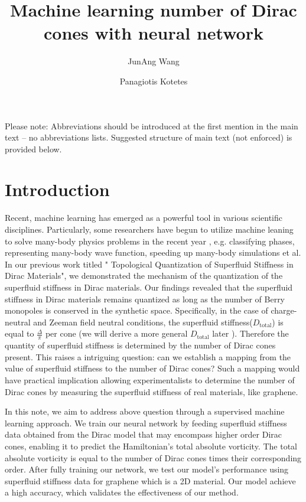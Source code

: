 \documentclass[fleqn,10pt,twocolumn]{wlscirep}
\title{Machine learning number of Dirac cones with neural network}
\author[1]{JunAng Wang}
\author[1,*]{Panagiotis Kotetes}
\affil[1]{CAS Key Laboratory of Theoretical Physics, Institute of Theoretical Physics, Chinese Academy of Sciences, Beijing 100190, China}
\affil[*]{kotetes@mail.itp.ac.cn}
\begin{document}
\flushbottom
\maketitle
%
%
\thispagestyle{empty}

\noindent Please note: Abbreviations should be introduced at the first mention in the main text – no abbreviations lists. Suggested structure of main text (not enforced) is provided below.

\section*{Introduction}

Recent, machine learning has emerged as a powerful tool in various scientific disciplines. Particularly, some researchers have begun to utilize  machine leaning to solve many-body physics problems in the recent year \cite{carleo2019machine,carrasquilla2020machine,johnston2022perspective}, e.g. classifying phases\cite{carrasquilla2017machine,wang2016discovering,tanaka2017detection,zhang2018machine}, representing many-body wave function\cite{carleo2017solving,sharir2020deep}, speeding up many-body simulations\cite{chen2018symmetry,wu2019solving,nagai2017self,liu2017self} et al.   In our previous work titled " Topological Quantization of Superfluid Stiffness in Dirac Materials"\cite{wang2022topological}, we demonstrated the mechanism of the quantization of the superfluid stiffness in Dirac materials. Our findings revealed that the superfluid stiffness in Dirac materials remains quantized as long as the number of Berry monopoles is conserved in the synthetic space. Specifically, in the case of charge-neutral and Zeeman field neutral conditions, the superfluid stiffness($ D_{\textrm{total}}  $) is equal to $  \frac{\Delta}{\pi}  $  per cone (we will derive a more general $ D_{\textrm{total}} $ later ). Therefore the quantity of superfluid stiffness is determined by the number of Dirac cones present. This raises a intriguing question: can we establish a mapping from the value of superfluid stiffness to the number of Dirac cones? Such a mapping would have practical implication allowing experimentalists to determine the number of Dirac cones by measuring the superfluid stiffness of real materials, like graphene.

In this note, we aim to address above question through a supervised machine learning approach. We train our neural network by feeding superfluid stiffness data obtained from the Dirac model that may encompass higher order Dirac cones, enabling it to predict the Hamiltonian's total absolute vorticity. The total absolute vorticity is equal to the number of Dirac cones times their corresponding order.  After fully training our network, we test our model's performance using superfluid stiffness data for graphene which is a 2D material. Our model achieve a high accuracy, which validates the effectiveness of our method.
\end{document}
